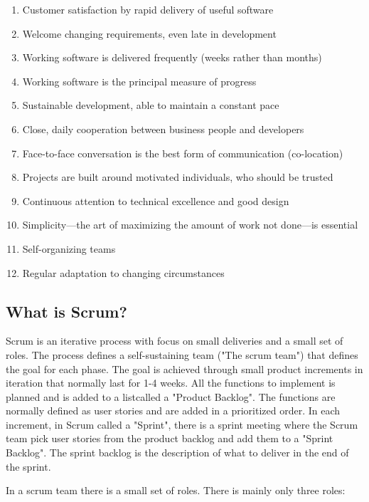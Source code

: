 \begin{enumerate}
    \item Customer satisfaction by rapid delivery of useful software
    \item Welcome changing requirements, even late in development
    \item Working software is delivered frequently (weeks rather than months)
    \item Working software is the principal measure of progress
    \item Sustainable development, able to maintain a constant pace
    \item Close, daily cooperation between business people and developers
    \item Face-to-face conversation is the best form of communication (co-location)
    \item Projects are built around motivated individuals, who should be trusted
    \item Continuous attention to technical excellence and good design
    \item Simplicity—the art of maximizing the amount of work not done—is essential
    \item Self-organizing teams
    \item Regular adaptation to changing circumstances
\end{enumerate}

\subsection*{What is Scrum?}

Scrum is an iterative process with focus on small deliveries and a small set of roles. 
The process defines a self-sustaining team ("The scrum team") that defines the goal for each phase. The goal 
is achieved through small product increments in iteration that normally last for 1-4 weeks. 
All the functions to implement is planned and is added to a listcalled a "Product Backlog". The
functions are normally defined as user stories and are added in a prioritized order. In each increment, 
in Scrum called a "Sprint", there is a sprint meeting where the Scrum team pick user stories from the 
product backlog and add them to a "Sprint Backlog". The sprint backlog is the description of what 
to deliver in the end of the sprint.

In a scrum team there is a small set of roles. There is mainly only three roles: 

